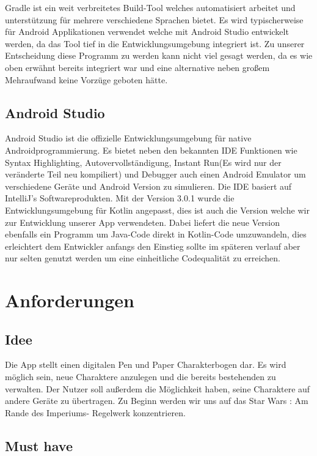 Gradle ist ein weit verbreitetes Build-Tool welches automatisiert arbeitet und unterstützung für mehrere verschiedene Sprachen bietet. Es wird typischerweise für Android Applikationen verwendet welche mit Android Studio entwickelt werden, da das Tool tief in die Entwicklungsumgebung integriert ist. Zu unserer Entscheidung diese Programm zu werden kann nicht viel gesagt werden, da es wie oben erwähnt bereits integriert war und eine alternative neben großem Mehraufwand keine Vorzüge geboten hätte.

\subsection{Android Studio}

Android Studio ist die offizielle Entwicklungsumgebung für native Androidprogrammierung. Es bietet neben den bekannten IDE Funktionen wie Syntax Highlighting, Autovervollständigung, Instant Run(Es wird nur der veränderte Teil neu kompiliert) und Debugger auch einen Android Emulator um verschiedene Geräte und Android Version zu simulieren. Die IDE basiert auf IntelliJ's Softwareprodukten. Mit der Version 3.0.1 wurde die Entwicklungsumgebung für Kotlin angepasst, dies ist auch die Version welche wir zur Entwicklung unserer App verwendeten. Dabei liefert die neue Version ebenfalls ein Programm um Java-Code direkt in Kotlin-Code umzuwandeln, dies erleichtert dem Entwickler anfangs den Einstieg sollte im späteren verlauf aber nur selten genutzt werden um eine einheitliche Codequalität zu erreichen.

\section{Anforderungen}

\subsection{Idee}

Die App stellt einen digitalen Pen und Paper Charakterbogen dar. Es wird möglich sein, neue Charaktere anzulegen und die bereits bestehenden zu verwalten. Der Nutzer soll außerdem die Möglichkeit haben, seine Charaktere auf andere Geräte zu übertragen. Zu Beginn werden wir uns auf das \glqq Star Wars : Am Rande des Imperiums\grqq- Regelwerk konzentrieren.
\subsection{Must have}


